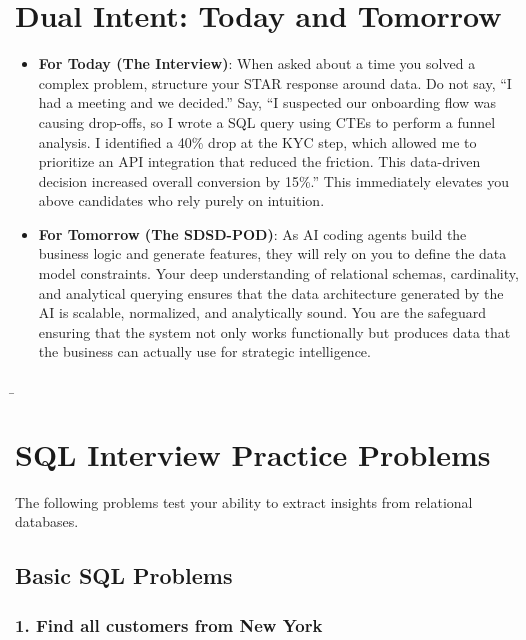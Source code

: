 \documentclass[
  11pt,
  openany,
  oneside]{book}
\providecommand{\tightlist}{%
  \setlength{\itemsep}{0pt}\setlength{\parskip}{0pt}}
\begin{document}
\bigskip

\section{Dual Intent: Today and
Tomorrow}\label{dual-intent-today-and-tomorrow-1}

\begin{itemize}
\tightlist
\item
  \textbf{For Today (The Interview)}: When asked about a time you solved
  a complex problem, structure your STAR response around data. Do not
  say, ``I had a meeting and we decided.'' Say, ``I suspected our
  onboarding flow was causing drop-offs, so I wrote a SQL query using
  CTEs to perform a funnel analysis. I identified a 40\% drop at the KYC
  step, which allowed me to prioritize an API integration that reduced
  the friction. This data-driven decision increased overall conversion
  by 15\%.'' This immediately elevates you above candidates who rely
  purely on intuition.
\item
  \textbf{For Tomorrow (The SDSD-POD)}: As AI coding agents build the
  business logic and generate features, they will rely on you to define
  the data model constraints. Your deep understanding of relational
  schemas, cardinality, and analytical querying ensures that the data
  architecture generated by the AI is scalable, normalized, and
  analytically sound. You are the safeguard ensuring that the system not
  only works functionally but produces data that the business can
  actually use for strategic intelligence.
\end{itemize}

\b

\section{SQL Interview Practice
Problems}\label{sql-interview-practice-problems}

The following problems test your ability to extract insights from
relational databases.

\subsection{Basic SQL Problems}\label{basic-sql-problems}

\subsubsection{1. Find all customers from New
York}\label{find-all-customers-from-new-york}
\end{document}
